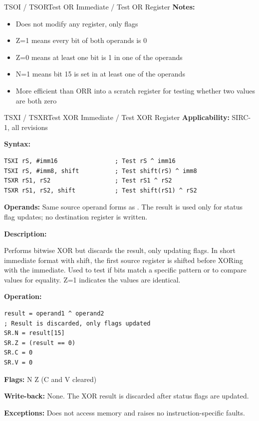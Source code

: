 \begin{instructionbox}{TSOI / TSOR}{Test OR Immediate / Test OR Register}
	\textbf{Notes:}
	\begin{itemize}
		\item Does not modify any register, only flags
		\item Z=1 means every bit of both operands is 0
		\item Z=0 means at least one bit is 1 in one of the operands
		\item N=1 means bit 15 is set in at least one of the operands
		\item More efficient than ORR into a scratch register for testing whether two values are both zero
	\end{itemize}
\end{instructionbox}

\begin{instructionbox}{TSXI / TSXR}{Test XOR Immediate / Test XOR Register}
	\textbf{Applicability:} SIRC-1, all revisions

	\textbf{Syntax:}
	\begin{lstlisting}
TSXI rS, #imm16                ; Test rS ^ imm16
TSXI rS, #imm8, shift          ; Test shift(rS) ^ imm8
TSXR rS1, rS2                  ; Test rS1 ^ rS2
TSXR rS1, rS2, shift           ; Test shift(rS1) ^ rS2
\end{lstlisting}

	\textbf{Operands:} Same source operand forms as . The result is used only for status flag updates; no
	destination register is written.

	\textbf{Description:}

	Performs bitwise XOR but discards the result, only updating flags. In short immediate format with shift, the first
	source register is shifted before XORing with the immediate. Used to test if bits match a specific pattern or to
	compare values for equality. Z=1 indicates the values are identical.

	\textbf{Operation:}
	\begin{verbatim}
result = operand1 ^ operand2
; Result is discarded, only flags updated
SR.N = result[15]
SR.Z = (result == 0)
SR.C = 0
SR.V = 0
\end{verbatim}

	\textbf{Flags:} N Z (C and V cleared)

	\textbf{Write-back:} None. The XOR result is discarded after status flags are updated.

	\textbf{Exceptions:} Does not access memory and raises no instruction-specific faults.


\end{instructionbox}
